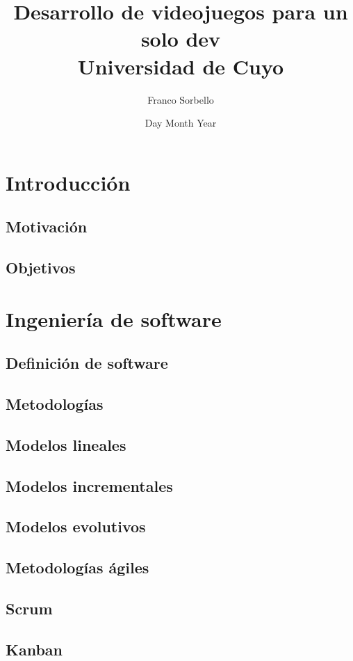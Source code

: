 \documentclass[12pt]{report}
\title{
    {Desarrollo de videojuegos para un solo dev}\\
    {\large Universidad de Cuyo}\\
}
\author{Franco Sorbello}
\date{Day Month Year}
\begin{document}
\maketitle
\tableofcontents
\chapter{Introducción}
\section{Motivación}

\section{Objetivos}


\chapter{Ingeniería de software}
\section{Definición de software}


\section{Metodologías} %


\section{Modelos lineales}


\section{Modelos incrementales}


\section{Modelos evolutivos}


\section{Metodologías ágiles}


\section{Scrum}


\section{Kanban}


\printbibliography
\end{document}
